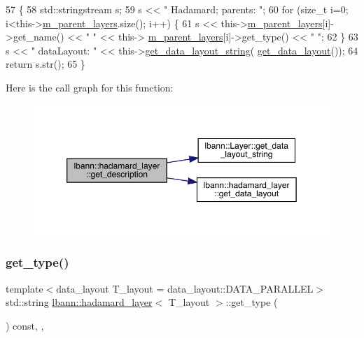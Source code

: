 \begin{DoxyCode}
57                                              \{
58     std::stringstream s;
59     s << \textcolor{stringliteral}{" Hadamard; parents: "};
60     \textcolor{keywordflow}{for} (\textcolor{keywordtype}{size\_t} i=0; i<this->\hyperlink{classlbann_1_1Layer_a3fa7c6cf1a22bb14ab0e85e3dc6027c5}{m\_parent\_layers}.size(); i++) \{
61       s << this->\hyperlink{classlbann_1_1Layer_a3fa7c6cf1a22bb14ab0e85e3dc6027c5}{m\_parent\_layers}[i]->get\_name() << \textcolor{stringliteral}{" "} << this->
      \hyperlink{classlbann_1_1Layer_a3fa7c6cf1a22bb14ab0e85e3dc6027c5}{m\_parent\_layers}[i]->get\_type() << \textcolor{stringliteral}{" "};
62     \}
63     s << \textcolor{stringliteral}{" dataLayout: "} << this->\hyperlink{classlbann_1_1Layer_ae3f4a5602df821f4221614b1e3782dc1}{get\_data\_layout\_string}(
      \hyperlink{classlbann_1_1hadamard__layer_ac7a67a906eaa7810997fa6448337f192}{get\_data\_layout}());
64     \textcolor{keywordflow}{return} s.str();
65   \}
\end{DoxyCode}
Here is the call graph for this function\+:\nopagebreak
\begin{figure}[H]
\begin{center}
\leavevmode
\includegraphics[width=350pt]{classlbann_1_1hadamard__layer_ad575b8b5efddaf3ee64c358b28198de9_cgraph}
\end{center}
\end{figure}
\mbox{\label{classlbann_1_1hadamard__layer_a2981073aa177cc71da8c0e83563a7fa0}} 
\subsubsection{\texorpdfstring{get\+\_\+type()}{get\_type()}}
{\footnotesize\ttfamily template$<$data\+\_\+layout T\+\_\+layout = data\+\_\+layout\+::\+D\+A\+T\+A\+\_\+\+P\+A\+R\+A\+L\+L\+EL$>$ \\
std\+::string \hyperlink{classlbann_1_1hadamard__layer}{lbann\+::hadamard\+\_\+layer}$<$ T\+\_\+layout $>$\+::get\+\_\+type (\begin{DoxyParamCaption}{ }\end{DoxyParamCaption}) const\hspace{0.3cm}{\ttfamily [inline]}, {\ttfamily [override]}, {\ttfamily [virtual]}}

